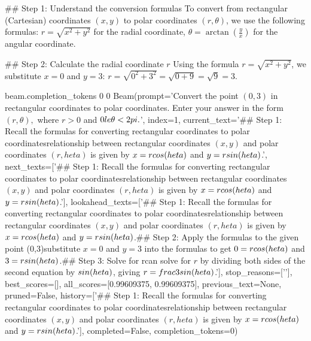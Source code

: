 ## Step 1: Understand the conversion formulas
To convert from rectangular (Cartesian) coordinates $(x, y)$ to polar coordinates $(r, \theta)$, we use the following formulas:
$r = \sqrt{x^2 + y^2}$ for the radial coordinate,
$\theta = \arctan\left(\frac{y}{x}\right)$ for the angular coordinate.

## Step 2: Calculate the radial coordinate $r$
Using the formula $r = \sqrt{x^2 + y^2}$, we substitute $x = 0$ and $y = 3$:
$r = \sqrt{0^2 + 3^2} = \sqrt{0 + 9} = \sqrt{9} = 3$.


beam.completion_tokens
0
0
Beam(prompt='Convert the point $(0,3)$ in rectangular coordinates to polar coordinates.  Enter your answer in the form $(r,\theta),$ where $r > 0$ and $0 \\le \theta < 2 \\pi.$', index=1, current_text='## Step 1: Recall the formulas for converting rectangular coordinates to polar coordinates\nThe relationship between rectangular coordinates $(x,y)$ and polar coordinates $(r,heta)$ is given by $x = r\\cos(heta)$ and $y = r\\sin(heta)$.\n\n', next_texts=['## Step 1: Recall the formulas for converting rectangular coordinates to polar coordinates\nThe relationship between rectangular coordinates $(x,y)$ and polar coordinates $(r,heta)$ is given by $x = r\\cos(heta)$ and $y = r\\sin(heta)$.\n\n'], lookahead_texts=['## Step 1: Recall the formulas for converting rectangular coordinates to polar coordinates\nThe relationship between rectangular coordinates $(x,y)$ and polar coordinates $(r,heta)$ is given by $x = r\\cos(heta)$ and $y = r\\sin(heta)$.\n\n## Step 2: Apply the formulas to the given point (0,3)\nWe substitute $x = 0$ and $y = 3$ into the formulas to get $0 = r\\cos(heta)$ and $3 = r\\sin(heta)$.\n\n## Step 3: Solve for r\nWe can solve for $r$ by dividing both sides of the second equation by $\\sin(heta)$, giving $r = \\frac{3}{\\sin(heta)}$.\n\n'], stop_reasons=['\n\n'], best_scores=[], all_scores=[0.99609375, 0.99609375], previous_text=None, pruned=False, history=['## Step 1: Recall the formulas for converting rectangular coordinates to polar coordinates\nThe relationship between rectangular coordinates $(x,y)$ and polar coordinates $(r,heta)$ is given by $x = r\\cos(heta)$ and $y = r\\sin(heta)$.\n\n'], completed=False, completion_tokens=0)
